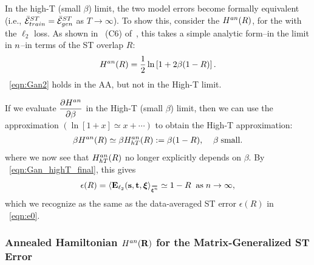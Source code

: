



In the high-T (small $\beta$) limit, the two model errors become formally equivalent
(i.e., $\bar{\mathcal{E}}^{ST}_{train}=\bar{\mathcal{E}}^{ST}_{gen}$ as $T\rightarrow\infty$).
To show this, consider the \AnnealedHamiltonian $H^{an}(R)$, for the \LinearPerceptron with the $\ell_2$ loss. 
As shown in \EQN~(C6) of~\cite{SST92}, this takes a simple analytic form--in the \LargeN limit in $n$--in terms of the ST overlap $R$:
\begin{align}
\label{eqn:Gan2}
H^{an}(R) = \dfrac{1}{2}\ln\left[{1+2\beta(1-R)}\right]  .
\end{align}
\EQN~\ref{eqn:Gan2} holds in the AA, but not in the High-T limit.

If we evaluate $\dfrac{\partial H^{an}}{\partial \beta}$ in the High-T (small $\beta$) limit, 
then we can use the approximation $(\ln[1+x]\simeq x+\cdots)$ to obtain the High-T approximation:
\begin{align}
\label{eqn:Gan3}
\beta H^{an}(R) \simeq 
\beta H^{an}_{hT}(R):=\beta(1-R),\;\;\;\;\beta\;\text{small}  .
\end{align}
where we now see that $H^{an}_{hT}(R)$ no longer explicitly depends on $\beta$.
%
By \EQN~\ref{eqn:Gan_highT_final}, this gives 
\begin{align}
\label{eqn:Gan4}
\EPSL(R) =
\langle  \mathbf{E}_{\ell_2}(\SVEC,\TVEC,\XI \rangle_{\AVGNDXI} \simeq 1-R\;\;\text{as}\;\ND\rightarrow\infty  ,
\end{align}
which we recognize as the same as the data-averaged ST error $\epsilon(R)$ in \EQN~\ref{eqn:e0}.


\subsubsection{Annealed Hamiltonian \texorpdfstring{$H^{an}(\mathbf{R})$}{H(R)} for the Matrix-Generalized ST Error}
\label{sxn:appendix_Gan}

